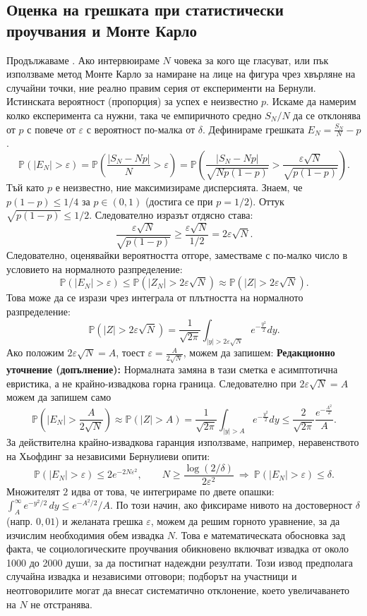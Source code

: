 \subsection{Оценка на грешката при статистически проучвания и Монте Карло}
Продължаваме . Ако интервюираме $N$ човека за кого ще гласуват, или пък използваме метод Монте Карло за намиране на лице на фигура чрез хвърляне на случайни точки, ние реално правим серия от експерименти на Бернули. Истинската вероятност (пропорция) за успех е неизвестно $p$.
Искаме да намерим колко експеримента са нужни, така че емпиричното средно $S_N/N$ да се отклонява от $p$ с повече от $\varepsilon$ с вероятност по-малка от $\delta$. Дефинираме грешката $E_N = \frac{S_N}{N} - p$.
\[ \mathbb{P}(|E_N| > \varepsilon) = \mathbb{P}\left( \frac{|S_N - Np|}{N} > \varepsilon \right) = \mathbb{P}\left( \frac{|S_N - Np|}{\sqrt{N p(1-p)}} > \frac{\varepsilon \sqrt{N}}{\sqrt{p(1-p)}} \right). \]
Тъй като $p$ е неизвестно, ние максимизираме дисперсията. Знаем, че $p(1-p) \le 1/4$ за $p \in (0,1)$ (достига се при $p=1/2$). Оттук $\sqrt{p(1-p)} \le 1/2$. Следователно изразът отдясно става:
\[ \frac{\varepsilon \sqrt{N}}{\sqrt{p(1-p)}} \ge \frac{\varepsilon \sqrt{N}}{1/2} = 2\varepsilon\sqrt{N}. \]
Следователно, оценявайки вероятността отгоре, заместваме с по-малко число в условието на нормалното разпределение:
\[ \mathbb{P}(|E_N| > \varepsilon) \le \mathbb{P}(|Z_N| > 2\varepsilon\sqrt{N}) \approx \mathbb{P}(|Z| > 2\varepsilon\sqrt{N}). \]
Това може да се изрази чрез интеграла от плътността на нормалното разпределение:
\[ \mathbb{P}(|Z| > 2\varepsilon\sqrt{N}) = \frac{1}{\sqrt{2\pi}} \int_{|y| > 2\varepsilon\sqrt{N}} e^{-\frac{y^2}{2}} dy. \]
Ако положим $2\varepsilon\sqrt{N} = A$, тоест $\varepsilon = \frac{A}{2\sqrt{N}}$, можем да запишем:
\textbf{Редакционно уточнение (допълнение):} Нормалната замяна в тази сметка е
асимптотична евристика, а не крайно-извадкова горна граница. Следователно при
$2\varepsilon\sqrt N=A$ можем да запишем само
\[ \mathbb{P}\left(|E_N| > \frac{A}{2\sqrt{N}}\right) \approx \mathbb{P}(|Z|>A) = \frac{1}{\sqrt{2\pi}} \int_{|y|>A} e^{-\frac{y^2}{2}} dy \le \frac{2}{\sqrt{2\pi}} \frac{e^{-\frac{A^2}{2}}}{A}. \]
За действителна крайно-извадкова гаранция използваме, например, неравенството на
Хьофдинг за независими Бернулиеви опити:
\[ \mathbb{P}(|E_N|>\varepsilon) \le 2e^{-2N\varepsilon^2}, \qquad
N\ge \frac{\log(2/\delta)}{2\varepsilon^2}\ \Longrightarrow\ \mathbb{P}(|E_N|>\varepsilon)\le\delta. \]
Множителят $2$ идва от това, че интегрираме по двете опашки: $\int_A^\infty e^{-y^2/2}\,dy \le e^{-A^2/2}/A$.
По този начин, ако фиксираме нивото на достоверност $\delta$ (напр. $0{,}01$) и желаната грешка $\varepsilon$, можем да решим горното уравнение, за да изчислим необходимия обем извадка $N$. Това е математическата обосновка зад факта, че социологическите проучвания обикновено включват извадка от около 1000 до 2000 души, за да постигнат надеждни резултати. Този извод предполага случайна извадка и независими отговори; подборът на участници и неотговорилите могат да внесат систематично отклонение, което увеличаването на $N$ не отстранява.

